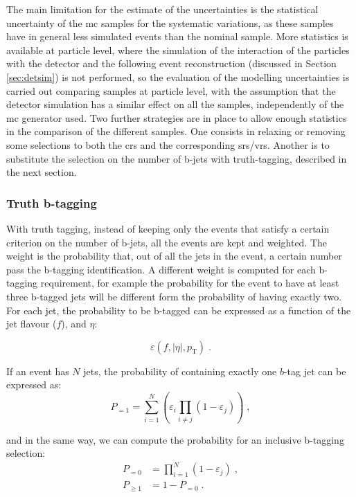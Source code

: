 The main limitation for the estimate of the uncertainties is the statistical uncertainty of the \gls{mc} samples for the systematic variations, as these samples have in general less simulated events than the nominal sample. 
More statistics is available at particle level, where the simulation of the interaction of the particles with the detector and the following event reconstruction (discussed in Section \ref{sec:detsim}) is not performed, so the evaluation of the \ttbar modelling uncertainties is carried out 
comparing samples at particle level, with the assumption that the detector simulation has a similar effect on all the samples, 
independently of the \gls{mc} generator used. Two further strategies are in place to allow enough statistics in the comparison of the different samples. 
One consists in relaxing or removing some selections to both the \glspl{cr} and the corresponding \glspl{sr}/\glspl{vr}. 
Another is to substitute the selection on the number of b-jets with truth-tagging, described in the next section.

\subsubsection*{Truth b-tagging}

With truth tagging, instead of keeping only the events that satisfy a certain criterion on the number of b-jets, all the events are kept and weighted. The weight is the probability that, out of all the jets in the event,
a certain number pass the b-tagging identification.
A different weight is computed for each b-tagging requirement, for example the probability for the event to have at least three b-tagged jets will be different form the probability of having exactly two. 
For each jet, the probability to be b-tagged can be expressed as a function of the jet flavour ($f$), \pt and $\eta$:

\begin{equation}
\varepsilon \left(f,|\eta|,p_{\mathrm{T}}\right) \; .
\label{eq:susy_common:btageff}
\end{equation}

\noindent If an event has $N$ jets, the probability of containing exactly one $b$-tag jet can be expressed as:
\begin{equation}
        P_{=1} = \sum\limits_{i=1}^N \left( \varepsilon_{i} \prod\limits_{i \neq j} \left( 1 - \varepsilon_{j} \right) \right) \; ,
\end{equation}

\noindent and in the same way, we can compute the probability for an inclusive b-tagging selection:
\begin{equation}
 \begin{split}
        P_{=0} &= \prod\limits_{i=1}^N \left( 1 - \varepsilon_{j} \right) \; ,\\
        P_{\geq 1} &= 1 - P_{=0} \; .
 \end{split}
\end{equation} 
 
